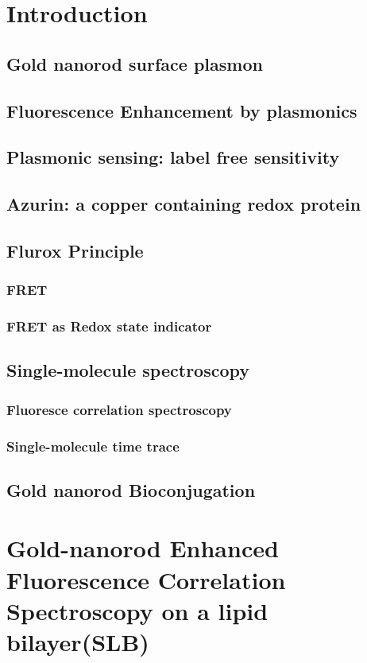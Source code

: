 \chapter{Introduction}
\section{Gold nanorod surface plasmon}
\section{Fluorescence Enhancement by plasmonics}
\section{Plasmonic sensing: label free sensitivity}
\section{Azurin: a copper containing redox protein}
\section{Flurox Principle}
\subsection{FRET}
\subsection{FRET as Redox state indicator}
\section{Single-molecule spectroscopy}
\subsection{Fluoresce correlation spectroscopy}
\subsection{Single-molecule time trace}
\section{Gold nanorod Bioconjugation}

\chapter{Gold-nanorod Enhanced Fluorescence Correlation Spectroscopy on a lipid bilayer(SLB)}

